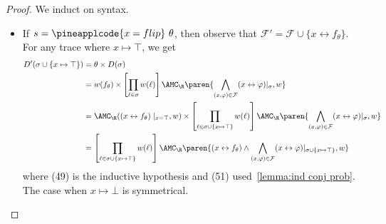 \begin{proof}
  We induct on syntax.
  \begin{itemize}[leftmargin=*]
    \item If $s = \pineapplcode{x = flip }\ \theta$, then observe that $\mathcal F' =\mathcal F \cup \{x \leftrightarrow f_\theta\}$.
    For any trace where $x \mapsto \top$, we get
    \begin{align}
      D'(\sigma \cup \{x \mapsto \top\})
        &= \theta \times D(\sigma)\\
        &= w(f_{\theta}) \times
        \left[ \prod_{\ell \in \sigma} w(\ell) \right]
        \AMC_{\R} \paren{
          \bigwedge_{(x, \varphi) \in \mathcal F} (x \leftrightarrow \varphi)|_{\sigma} , w
        }
        \\
        &= \AMC_{\R}((x \leftrightarrow f_{\theta})\mid_{x = \top}, w) \times
        \left[ \prod_{\ell \in \sigma \cup \{x \mapsto \top\} } w(\ell) \right]
        \AMC_{\R} \paren{
          \bigwedge_{(x, \varphi) \in \mathcal F} (x \leftrightarrow \varphi)|_{\sigma} , w
        }
        \\
        &=
        \left[ \prod_{\ell \in \sigma \cup \{x \mapsto \top\} } w(\ell) \right]
        \AMC_{\R} \paren{
          (x \leftrightarrow f_{\theta}) \land \bigwedge_{(x, \varphi) \in \mathcal F} (x \leftrightarrow \varphi)|_{\sigma \cup \{x \mapsto \top\}} , w
        }
    \end{align}
    where (49) is the inductive hypothesis and (51) used~\cref{lemma:ind conj prob}.
    The case when $x \mapsto \bot$ is symmetrical.


\end{itemize}
\end{proof}
